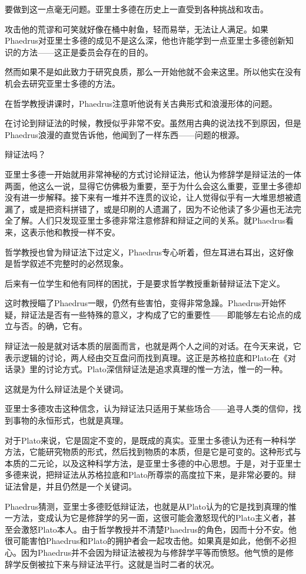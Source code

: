 \documentclass[UTF8]{article}
\begin{document}
\par 要做到这一点毫无问题。亚里士多德在历史上一直受到各种挑战和攻击。
\par 攻击他的荒谬和可笑就好像在桶中射鱼，轻而易举，无法让人满足。如果Phaedrus对亚里士多德的成见不是这么深，他也许能学到一点亚里士多德创新知识的方法——这正是委员会存在的目的。
\par 然而如果不是如此致力于研究良质，那么一开始他就不会来这里。所以他实在没有机会去研究亚里士多德的方法。
\par 在哲学教授讲课时，Phaedrus注意听他说有关古典形式和浪漫形体的问题。
\par 在讨论到辩证法的时候，教授似乎非常不安。虽然用古典的说法找不到原因，但是Phaedrus浪漫的直觉告诉他，他闻到了一样东西——问题的根源。
\par 辩证法吗？
\par 亚里士多德一开始就用非常神秘的方式讨论辩证法，他认为修辞学是辩证法的一体两面，他这么一说，显得它仿佛极为重要，至于为什么会这么重要，亚里士多德却没有进一步解释。接下来有一堆并不连贯的议论，让人觉得似乎有一大堆思想被遗漏了，或是把资料拼错了，或是印刷的人遗漏了，因为不论他读了多少遍也无法完全了解。人们只发现亚里士多德非常注意修辞和辩证之间的关系。就Phaedrus看来，这表示他和教授一样不安。
\par 哲学教授也曾为辩证法下过定义，Phaedrus专心听着，但左耳进右耳出，这好像是哲学叙述不完整时的必然现象。
\par 后来有一位学生和他有同样的困扰，于是要求哲学教授重新替辩证法下定义。
\par 这时教授瞄了Phaedrus一眼，仍然有些害怕，变得非常急躁。Phaedrus开始怀疑，辩证法是否有一些特殊的意义，才构成了它的重要性——即能够左右论点的成立与否。的确，它有。
\par 辩证法一般是就对话本质的层面而言，也就是两个人之间的对话。在今天来说，它表示逻辑的讨论，两人经由交互盘问而找到真理。这正是苏格拉底和Plato在《对话录》里的讨论方式。Plato深信辩证法是追求真理的惟一方法，惟一的一种。
\par 这就是为什么辩证法是个关键词。
\par 亚里士多德攻击这种信念，认为辩证法只适用于某些场合——追寻人类的信仰，找到事物的永恒形式，也就是真理。
\par 对于Plato来说，它是固定不变的，是既成的真实。亚里士多德认为还有一种科学方法，它能研究物质的形式，然后找到物质的本质，但是它是可变的。这种形式与本质的二元论，以及这种科学方法，是亚里士多德的中心思想。于是，对于亚里士多德来说，把辩证法从苏格拉底和Plato所尊崇的高度拉下来，是非常必要的。辩证法曾是，并且仍然是一个关键词。
\par Phaedrus猜测，亚里士多德贬低辩证法，也就是从Plato认为的它是找到真理的惟一方法，变成认为它是修辞学的另一面，这很可能会激怒现代的Plato主义者，甚至会激怒Plato本人。由于哲学教授并不清楚Phaedrus的角色，因而十分不安。他很可能害怕Phaedrus和Plato的拥护者会一起攻击他。如果真是如此，他倒不必担心。因为Phaedrus并不会因为辩证法被视为与修辞学平等而愤怒。他气愤的是修辞学反倒被拉下来与辩证法平行。这就是当时二者的状况。
\end{document}
